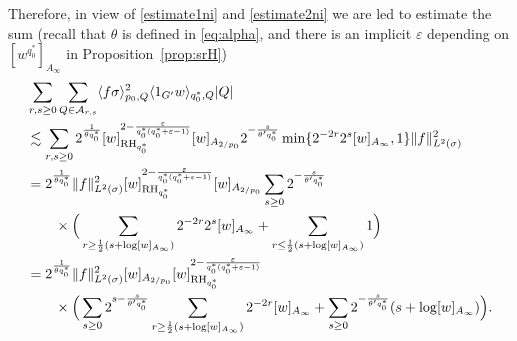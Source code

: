 \documentclass[11pt,reqno]{amsart}
\theoremstyle{plain} %
\newcommand{\1}{ \mathbbm{1}}   %
\theoremstyle{definition}
\theoremstyle{remark}
\numberwithin{equation}{section}
\begin{document}
Therefore, in view of \eqref{estimate1ni} and \eqref{estimate2ni} we are led to estimate the sum (recall that $\theta$ is defined in \eqref{eq:alpha}, and there is an implicit $\varepsilon$ depending on $[w^{q_0^*}]_{A_{\infty}} $ in Proposition~\ref{prop:srH}) 
\begin{align}
\label{eq:todojunto}
\notag&  \sum_{r,s\ge 0} \sum_{Q\in\mathcal A_{r,s}} \langle f \sigma \rangle_{p_0, Q}^2  \langle 1_{G'} w \rangle_{q_0^*, Q}|Q| \\
\notag& \lesssim   \sum_{r,s\ge 0}2^{\frac{1}{\theta q_0^*}} [w]_{\operatorname{RH}_{q_0^*}}^{2-\frac{\varepsilon}{q_0^*(q_0^*+\varepsilon-1)}}[w]_{A_{2/p_0}} 2^{-\frac{s}{\theta'q_0^*}}\min\{2^{-2r}2^s[w]_{A_{\infty}},1\}\|f\|_{L^{2}(\sigma)}^{2} \\
\notag& = 2^{\frac{1}{\theta q_0^*}} \|f\|_{L^{2}(\sigma)}^{2} [w]_{\operatorname{RH}_{q_0^*}}^{2-\frac{\varepsilon}{q_0^*(q_0^*+\varepsilon-1)}}[w]_{A_{2/p_0}}\sum_{s\ge 0} 2^{-\frac{s}{\theta'q_0^*}}\\
\notag&\qquad \times\Big(\sum_{r\ge\frac12(s+\log[w]_{A_{\infty}})}2^{-2r}2^s[w]_{A_{\infty}}
+\sum_{r\le\frac12(s+\log[w]_{A_{\infty}})}1\Big)\\
\notag& = 2^{\frac{1}{\theta q_0^*}} \|f\|_{L^{2}(\sigma)}^{2} [w]_{A_{2/p_0}} [w]_{\operatorname{RH}_{q_0^*}}^{2-\frac{\varepsilon}{q_0^*(q_0^*+\varepsilon-1)}} \\
&\qquad\times\Big(\sum_{s\ge 0} 2^{s-\frac{s}{\theta'q_0^*}}\sum_{r\ge\frac12(s+\log[w]_{A_{\infty}})}2^{-2r}[w]_{A_{\infty}}
+\sum_{s\ge0}2^{-\frac{s}{\theta'q_0^*}}(s + \log[w]_{A_{\infty}})\Big).
\end{align}
\color{black}
\end{document}
